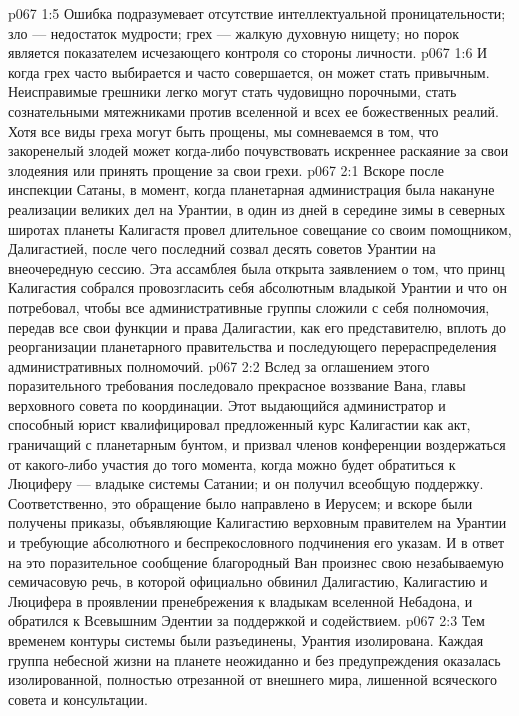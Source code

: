 \vs p067 1:5 Ошибка подразумевает отсутствие интеллектуальной проницательности; зло --- недостаток мудрости; грех --- жалкую духовную нищету; но порок является показателем исчезающего контроля со стороны личности.
\vs p067 1:6 И когда грех часто выбирается и часто совершается, он может стать привычным. Неисправимые грешники легко могут стать чудовищно порочными, стать сознательными мятежниками против вселенной и всех ее божественных реалий. Хотя все виды греха могут быть прощены, мы сомневаемся в том, что закоренелый злодей может когда\hyp{}либо почувствовать искреннее раскаяние за свои злодеяния или принять прощение за свои грехи.
\vs p067 2:1 Вскоре после инспекции Сатаны, в момент, когда планетарная администрация была накануне реализации великих дел на Урантии, в один из дней в середине зимы в северных широтах планеты Калигастя провел длительное совещание со своим помощником, Далигастией, после чего последний созвал десять советов Урантии на внеочередную сессию. Эта ассамблея была открыта заявлением о том, что принц Калигастия собрался провозгласить себя абсолютным владыкой Урантии и что он потребовал, чтобы все административные группы сложили с себя полномочия, передав все свои функции и права Далигастии, как его представителю, вплоть до реорганизации планетарного правительства и последующего перераспределения административных полномочий.
\vs p067 2:2 Вслед за оглашением этого поразительного требования последовало прекрасное воззвание Вана, главы верховного совета по координации. Этот выдающийся администратор и способный юрист квалифицировал предложенный курс Калигастии как акт, граничащий с планетарным бунтом, и призвал членов конференции воздержаться от какого\hyp{}либо участия до того момента, когда можно будет обратиться к Люциферу --- владыке системы Сатании; и он получил всеобщую поддержку. Соответственно, это обращение было направлено в Иерусем; и вскоре были получены приказы, объявляющие Калигастию верховным правителем на Урантии и требующие абсолютного и беспрекословного подчинения его указам. И в ответ на это поразительное сообщение благородный Ван произнес свою незабываемую семичасовую речь, в которой официально обвинил Далигастию, Калигастию и Люцифера в проявлении пренебрежения к владыкам вселенной Небадона, и обратился к Всевышним Эдентии за поддержкой и содействием.
\vs p067 2:3 \pc Тем временем контуры системы были разъединены, Урантия изолирована. Каждая группа небесной жизни на планете неожиданно и без предупреждения оказалась изолированной, полностью отрезанной от внешнего мира, лишенной всяческого совета и консультации.
